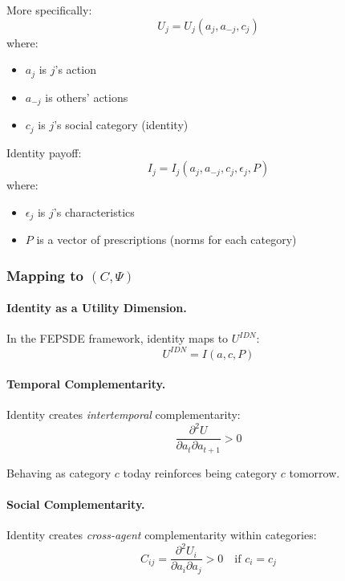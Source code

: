 \documentclass[12pt,a4paper]{article}
\begin{document}
More specifically:
\begin{equation}
  U_j = U_j(a_j, a_{-j}, c_j)
\end{equation}
where:
\begin{itemize}
  \item $a_j$ is $j$'s action
  \item $a_{-j}$ is others' actions
  \item $c_j$ is $j$'s social category (identity)
\end{itemize}

Identity payoff:
\begin{equation}
  I_j = I_j(a_j, a_{-j}, c_j, \epsilon_j, P)
\end{equation}
where:
\begin{itemize}
  \item $\epsilon_j$ is $j$'s characteristics
  \item $P$ is a vector of prescriptions (norms for each category)
\end{itemize}

\subsubsection{Mapping to $(C, \Psi)$}

\paragraph{Identity as a Utility Dimension.}
In the FEPSDE framework, identity maps to $U^{IDN}$:
\begin{equation}
  U^{IDN} = I(a, c, P)
\end{equation}

\paragraph{Temporal Complementarity.}
Identity creates \emph{intertemporal} complementarity:
\begin{equation}
  \frac{\partial^2 U}{\partial a_t \partial a_{t+1}} > 0
\end{equation}

Behaving as category $c$ today reinforces being category $c$ tomorrow.

\paragraph{Social Complementarity.}
Identity creates \emph{cross-agent} complementarity within categories:
\begin{equation}
  C_{ij} = \frac{\partial^2 U_i}{\partial a_i \partial a_j} > 0 
  \quad \text{if } c_i = c_j
\end{equation}
\end{document}
